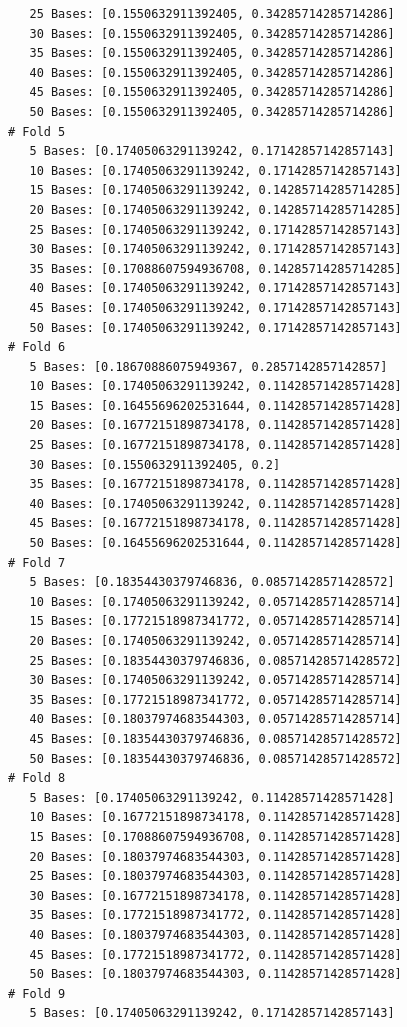 \documentclass[12pt]{amsart}
\begin{document}
\begin{verbatim}
   25 Bases: [0.1550632911392405, 0.34285714285714286]
   30 Bases: [0.1550632911392405, 0.34285714285714286]
   35 Bases: [0.1550632911392405, 0.34285714285714286]
   40 Bases: [0.1550632911392405, 0.34285714285714286]
   45 Bases: [0.1550632911392405, 0.34285714285714286]
   50 Bases: [0.1550632911392405, 0.34285714285714286]
# Fold 5
   5 Bases: [0.17405063291139242, 0.17142857142857143]
   10 Bases: [0.17405063291139242, 0.17142857142857143]
   15 Bases: [0.17405063291139242, 0.14285714285714285]
   20 Bases: [0.17405063291139242, 0.14285714285714285]
   25 Bases: [0.17405063291139242, 0.17142857142857143]
   30 Bases: [0.17405063291139242, 0.17142857142857143]
   35 Bases: [0.17088607594936708, 0.14285714285714285]
   40 Bases: [0.17405063291139242, 0.17142857142857143]
   45 Bases: [0.17405063291139242, 0.17142857142857143]
   50 Bases: [0.17405063291139242, 0.17142857142857143]
# Fold 6
   5 Bases: [0.18670886075949367, 0.2857142857142857]
   10 Bases: [0.17405063291139242, 0.11428571428571428]
   15 Bases: [0.16455696202531644, 0.11428571428571428]
   20 Bases: [0.16772151898734178, 0.11428571428571428]
   25 Bases: [0.16772151898734178, 0.11428571428571428]
   30 Bases: [0.1550632911392405, 0.2]
   35 Bases: [0.16772151898734178, 0.11428571428571428]
   40 Bases: [0.17405063291139242, 0.11428571428571428]
   45 Bases: [0.16772151898734178, 0.11428571428571428]
   50 Bases: [0.16455696202531644, 0.11428571428571428]
# Fold 7
   5 Bases: [0.18354430379746836, 0.08571428571428572]
   10 Bases: [0.17405063291139242, 0.05714285714285714]
   15 Bases: [0.17721518987341772, 0.05714285714285714]
   20 Bases: [0.17405063291139242, 0.05714285714285714]
   25 Bases: [0.18354430379746836, 0.08571428571428572]
   30 Bases: [0.17405063291139242, 0.05714285714285714]
   35 Bases: [0.17721518987341772, 0.05714285714285714]
   40 Bases: [0.18037974683544303, 0.05714285714285714]
   45 Bases: [0.18354430379746836, 0.08571428571428572]
   50 Bases: [0.18354430379746836, 0.08571428571428572]
# Fold 8
   5 Bases: [0.17405063291139242, 0.11428571428571428]
   10 Bases: [0.16772151898734178, 0.11428571428571428]
   15 Bases: [0.17088607594936708, 0.11428571428571428]
   20 Bases: [0.18037974683544303, 0.11428571428571428]
   25 Bases: [0.18037974683544303, 0.11428571428571428]
   30 Bases: [0.16772151898734178, 0.11428571428571428]
   35 Bases: [0.17721518987341772, 0.11428571428571428]
   40 Bases: [0.18037974683544303, 0.11428571428571428]
   45 Bases: [0.17721518987341772, 0.11428571428571428]
   50 Bases: [0.18037974683544303, 0.11428571428571428]
# Fold 9
   5 Bases: [0.17405063291139242, 0.17142857142857143]

\end{verbatim}
\end{document}

